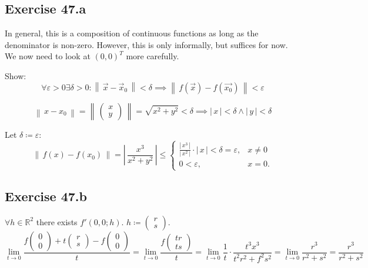 \documentclass[a4paper]{article}
\theoremstyle{definition}
\newcommand\abs[1]{\left|\,#1\,\right|}
\newcommand\norm[1]{\left\|\,#1\,\right\|}
\begin{document}
\subsection{Exercise 47.a}

In general, this is a composition of continuous functions as long as the denominator is non-zero.
However, this is only informally, but suffices for now.
We now need to look at $(0, 0)^T$ more carefully.

Show:
\[
  \forall \varepsilon > 0 \exists \delta > 0:
  \norm{\vec{x} - \vec{x}_0} < \delta \implies \norm{f(\vec{x}) - f(\vec{x_0})} < \varepsilon
\]

\[
  \norm{x - x_0}
  = \norm{\begin{pmatrix} x \\ y \end{pmatrix}}
  = \sqrt{x^2 + y^2} < \delta
  \implies \abs{x} < \delta \land \abs{y} < \delta
\]

Let $\delta \coloneqq \varepsilon$:
\[
  \norm{f(x) - f(x_0)} = \abs{\frac{x^3}{x^2 + y^2}}
  \leq \begin{cases}
    \frac{\abs{x^3}}{\abs{x^2}} \cdot \abs{x} < \delta = \varepsilon,
      & x \neq 0 \\
    0 < \varepsilon,
      & x = 0.
  \end{cases}
\]

\subsection{Exercise 47.b}
%
$\forall h \in \mathbb R^2$ there exists $f'(0,0;h)$. $h \coloneqq \begin{pmatrix} r \\ s \end{pmatrix}$.
\[
  \lim_{t\to0} \frac{f\begin{pmatrix} 0 \\ 0 \end{pmatrix} + t \begin{pmatrix} r \\ s \end{pmatrix} - f\begin{pmatrix} 0 \\ 0 \end{pmatrix}}{t}
  = \lim_{t\to0} \frac{f\begin{pmatrix} tr \\ ts \end{pmatrix}}{t}
  = \lim_{t\to0} \frac1t \cdot \frac{t^3 x^3}{t^2 r^2 + f^2 s^2} = \lim_{t\to 0} \frac{r^3}{r^2 + s^2} = \frac{r^3}{r^2 + s^2}
\]
\end{document}
